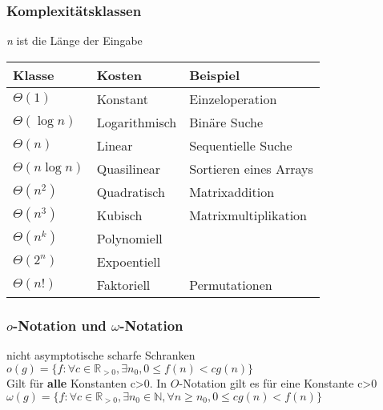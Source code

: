 \documentclass[jou,apacite]{apa6}
\begin{document}
\subsubsection{Komplexitätsklassen}
{\itshape n} ist die Länge der Eingabe
\begin{table}[h]
\centering
\begin{tabular}{|l|l|l|}
\hline
Klasse & Kosten & Beispiel \\
\hline
$\Theta(1)$     & Konstant    &  Einzeloperation         \\
 $\Theta(\log n)$    & Logarithmisch    &  Binäre Suche         \\
 $\Theta(n)$    & Linear   &  Sequentielle Suche         \\
 $\Theta(n \log n)$    & Quasilinear     &  Sortieren eines Arrays          \\
 $\Theta(n^2)$    & Quadratisch   & Matrixaddition      \\
 $\Theta(n^3)$    & Kubisch   &  Matrixmultiplikation        \\
 $\Theta(n^k)$    & Polynomiell    &           \\
 $\Theta(2^n)$    & Expoentiell    &           \\
$\Theta(n!)$     &  Faktoriell      &  Permutationen      \\
\hline
\end{tabular}
\end{table}

\subsubsection{$o$-Notation und $\omega$-Notation}
nicht asymptotische scharfe Schranken
\\
$o(g) = \{f : \forall c \in \mathbb{R}_{>0},\exists n_0,0 \le f(n) < cg(n)\}$
\\
Gilt für {\bfseries alle} Konstanten c>0. In $O$-Notation gilt es für eine Konstante c>0
\\
$\omega(g) = \{ f : \forall c \in \mathbb{R}_{>0},\exists n_0 \in \mathbb{N},\forall n \ge n_0,0\le cg(n) < f(n)\}$
\end{document}
